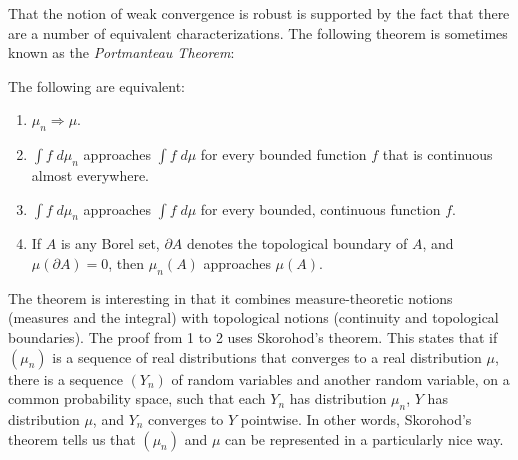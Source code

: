 \documentclass{svjour3}
\begin{document}
That the notion of weak convergence is robust is supported by the fact that there are a number of equivalent characterizations. The following theorem is sometimes known as the \emph{Portmanteau Theorem}:
\begin{theorem}
The following are equivalent:
\begin{enumerate}
 \item $\mu_n \Rightarrow \mu$.
 \item $\int f \; d\mu_n$ approaches $\int f \; d\mu$ for every bounded function $f$ that is continuous almost everywhere.
 \item $\int f \; d\mu_n$ approaches $\int f \; d\mu$ for every bounded, continuous function $f$.
 \item If $A$ is any Borel set, $\partial A$ denotes the topological boundary of $A$, and $\mu(\partial A) = 0$, then $\mu_n(A)$ approaches $\mu(A)$. 
\end{enumerate}
\end{theorem}
The theorem is interesting in that it combines measure-theoretic notions (measures and the integral) with topological notions (continuity and topological boundaries). The proof from 1 to 2 uses Skorohod's theorem. This states that if $(\mu_n)$ is a sequence of real distributions that converges to a real distribution $\mu$, there is a sequence $(Y_n)$ of random variables and another random variable, on a common probability space, such that each $Y_n$ has distribution $\mu_n$, $Y$ has distribution $\mu$, and $Y_n$ converges to $Y$ pointwise. In other words, Skorohod's theorem tells us that $(\mu_n)$ and $\mu$ can be represented in a particularly nice way. 
\end{document}
